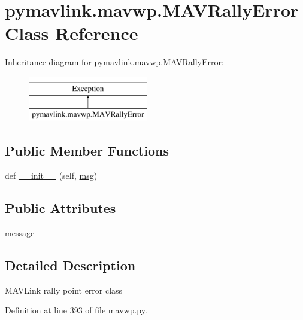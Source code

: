\hypertarget{classpymavlink_1_1mavwp_1_1MAVRallyError}{}\section{pymavlink.\+mavwp.\+M\+A\+V\+Rally\+Error Class Reference}
\label{classpymavlink_1_1mavwp_1_1MAVRallyError}
Inheritance diagram for pymavlink.\+mavwp.\+M\+A\+V\+Rally\+Error\+:\begin{figure}[H]
\begin{center}
\leavevmode
\includegraphics[height=2.000000cm]{classpymavlink_1_1mavwp_1_1MAVRallyError}
\end{center}
\end{figure}
\subsection*{Public Member Functions}
\begin{DoxyCompactItemize}
\item 
def \mbox{\hyperlink{classpymavlink_1_1mavwp_1_1MAVRallyError_ae934706d7f853e9a93e7ce5b9c6feba4}{\+\_\+\+\_\+init\+\_\+\+\_\+}} (self, \mbox{\hyperlink{stratnode_8cpp_a82cfe4ed9bc9e1b07c8bf209c324d85b}{msg}})
\end{DoxyCompactItemize}
\subsection*{Public Attributes}
\begin{DoxyCompactItemize}
\item 
\mbox{\hyperlink{classpymavlink_1_1mavwp_1_1MAVRallyError_aa6a58e51c7b80f467341193dd32237d0}{message}}
\end{DoxyCompactItemize}


\subsection{Detailed Description}
\begin{DoxyVerb}MAVLink rally point error class\end{DoxyVerb}
 

Definition at line 393 of file mavwp.\+py.



